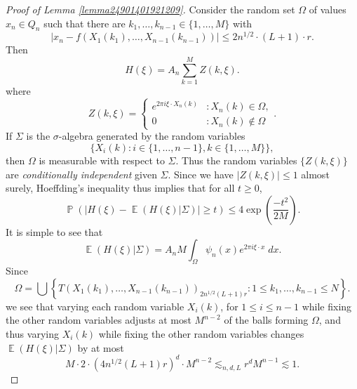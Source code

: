 \documentclass[dvipsnames,letterpaper,12pt]{article}
\numberwithin{equation}{section}
\numberwithin{theorem}{section}
\DeclareMathOperator{\EE}{\mathbb{E}}
\DeclareMathOperator{\PP}{\mathbb{P}}
\begin{document}
\begin{proof}[Proof of Lemma \ref{lemma24901401921209}]
    Consider the random set $\Omega$ of values $x_n \in Q_n$ such that there are $k_1,\dots,k_{n-1} \in \{ 1,\dots,M \}$ with
    \begin{equation}
        |x_n - f(X_1(k_1),\dots,X_{n-1}(k_{n-1}))| \leq 2 n^{1/2} \cdot (L+1) \cdot r.
    \end{equation}
    Then
    \begin{equation}
        H(\xi) = A_n \sum_{k = 1}^M Z(k,\xi).
    \end{equation}
    where
    \[ Z(k,\xi) = \begin{cases} e^{2 \pi i \xi \cdot X_n(k)} &: X_n(k) \in \Omega, \\ 0 &: X_n(k) \not \in \Omega \end{cases}. \]
    If $\Sigma$ is the $\sigma$-algebra generated by the random variables
    \[ \{ X_i(k) : i \in \{ 1, \dots, n-1 \}, k \in \{ 1, \dots, M \} \}, \]
    then $\Omega$ is measurable with respect to $\Sigma$. Thus the random variables $\{ Z(k,\xi) \}$ are \emph{conditionally independent} given $\Sigma$. Since we have $|Z(k,\xi)| \leq 1$ almost surely, Hoeffding's inequality thus implies that for all $t \geq 0$,
    \begin{equation} \label{equationCOIJCOIJX1232312}
        \PP \left( \left| H(\xi) - \EE(H(\xi)|\Sigma) \right| \geq t \right) \leq 4 \exp \left( \frac{-t^2}{2M} \right).
    \end{equation}
    It is simple to see that
    \begin{equation}
        \EE(H(\xi) | \Sigma) = A_n M \int_\Omega \psi_n(x) e^{2 \pi i \xi \cdot x}\; dx.
    \end{equation}
    Since
    \begin{equation}
        \Omega = \bigcup \left\{ T(X_1(k_1),\dots,X_{n-1}(k_{n-1}))_{2 n^{1/2} (L+1) r} : 1 \leq k_1,\dots,k_{n-1} \leq N \right\}.
    \end{equation}
    we see that varying each random variable $X_i(k)$, for $1 \leq i \leq n-1$ while fixing the other random variables adjusts at most $M^{n-2}$ of the balls forming $\Omega$, and thus varying $X_i(k)$ while fixing the other random variables changes $\EE(H(\xi)|\Sigma)$ by at most
    \begin{equation}
        M \cdot 2 \cdot (4n^{1/2} (L+1) r)^d \cdot M^{n-2} \lesssim_{n,d,L} r^d M^{n-1} \lesssim 1.

\end{equation}
\end{proof}
\end{document}
